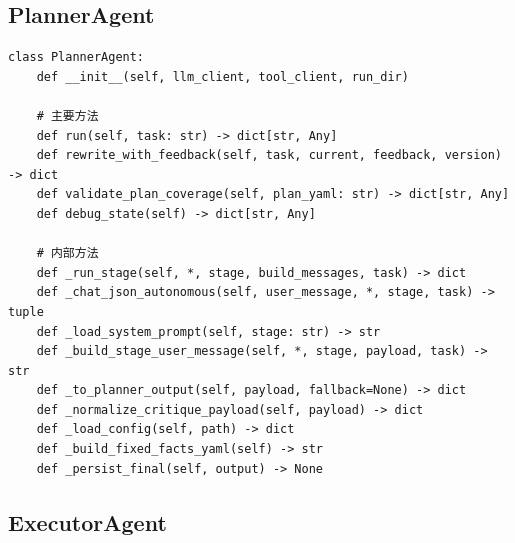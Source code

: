 \documentclass[12pt,a4paper]{ctexart}
\begin{document}
\subsection{PlannerAgent}

\begin{lstlisting}[style=pycode]
class PlannerAgent:
    def __init__(self, llm_client, tool_client, run_dir)

    # 主要方法
    def run(self, task: str) -> dict[str, Any]
    def rewrite_with_feedback(self, task, current, feedback, version) -> dict
    def validate_plan_coverage(self, plan_yaml: str) -> dict[str, Any]
    def debug_state(self) -> dict[str, Any]

    # 内部方法
    def _run_stage(self, *, stage, build_messages, task) -> dict
    def _chat_json_autonomous(self, user_message, *, stage, task) -> tuple
    def _load_system_prompt(self, stage: str) -> str
    def _build_stage_user_message(self, *, stage, payload, task) -> str
    def _to_planner_output(self, payload, fallback=None) -> dict
    def _normalize_critique_payload(self, payload) -> dict
    def _load_config(self, path) -> dict
    def _build_fixed_facts_yaml(self) -> str
    def _persist_final(self, output) -> None
\end{lstlisting}

\subsection{ExecutorAgent}
\end{document}
